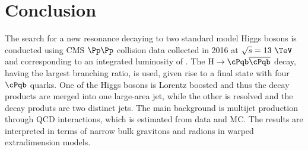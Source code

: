 \section{Conclusion\label{sec:Summary}}
The search for a new resonance decaying to two standard model Higgs bosons is conducted using CMS $\Pp\Pp$ collision data collected in 2016 at $\sqrt{s} = 13~\TeV$ and corresponding to an integrated luminosity of \intLumi. The $\Hbb$ decay, having the largest branching ratio, is used, given rise to a final state with four $\cPqb$ quarks. One of the Higgs bosons is Lorentz boosted and thus the decay products are merged into one large-area jet, while the other is resolved and the decay produts are two distinct jets. The main background is multijet production through QCD interactions, which is estimated from data and \ttbar MC. The results are interpreted in terms of narrow bulk gravitons and radions in warped extradimension models.
